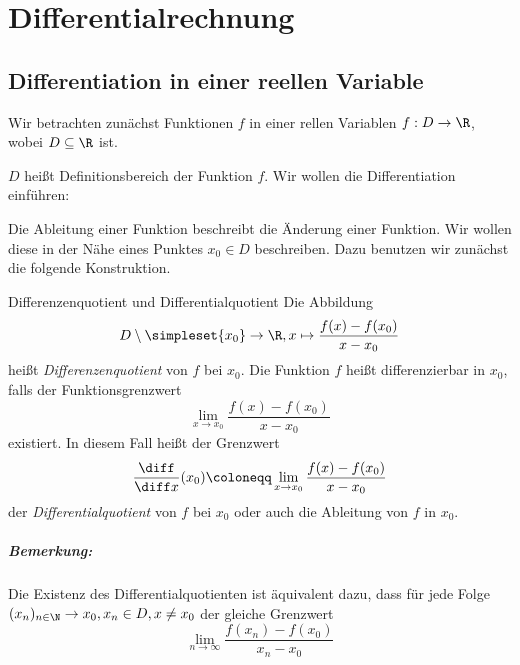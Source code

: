 \chapter{Differentialrechnung}
\section{Differentiation in einer reellen Variable}
Wir betrachten zunächst Funktionen $f$ in einer rellen Variablen $f:D\rightarrow \R$, wobei $D\subseteq\R$ ist.

$D$ heißt Definitionsbereich der Funktion $f$. Wir wollen die Differentiation einführen:

Die Ableitung einer Funktion beschreibt die Änderung einer Funktion. Wir wollen diese in der Nähe eines Punktes $x_0\in D$ beschreiben. Dazu benutzen wir zunächst die folgende Konstruktion.

\begin{definition}{Differenzenquotient und Differentialquotient}
	Die Abbildung
	\begin{equation*}
		D\setminus\simpleset{x_0}\rightarrow \R, x\mapsto\frac{f(x)-f(x_0)}{x-x_0}
	\end{equation*}
	heißt \emph{Differenzenquotient} von $f$ bei $x_0$.
	Die Funktion $f$ heißt differenzierbar in $x_0$, falls der Funktionsgrenzwert
	\begin{equation*}
		\lim\limits_{x\to x_0}\frac{f(x)-f(x_0)}{x-x_0}
	\end{equation*}
	existiert. In diesem Fall heißt der Grenzwert
	\begin{equation*}
		\frac{\diff}{\diff x}(x_0)\coloneqq \lim\limits_{x\to x_0}\frac{f(x)-f(x_0)}{x-x_0}
	\end{equation*}
	der \emph{Differentialquotient} von $f$ bei $x_0$ oder auch die Ableitung von $f$ in $x_0$.
\end{definition}
\paragraph{Bemerkung:}
Die Existenz des Differentialquotienten ist äquivalent dazu, dass für jede Folge $(x_n)_{n\in\N}\to x_0, x_n\in D,x\neq x_0$ der gleiche Grenzwert
\begin{equation*}
	\lim\limits_{n\to\infty}\frac{f(x_n)-f(x_0)}{x_n-x_0}
\end{equation*}

